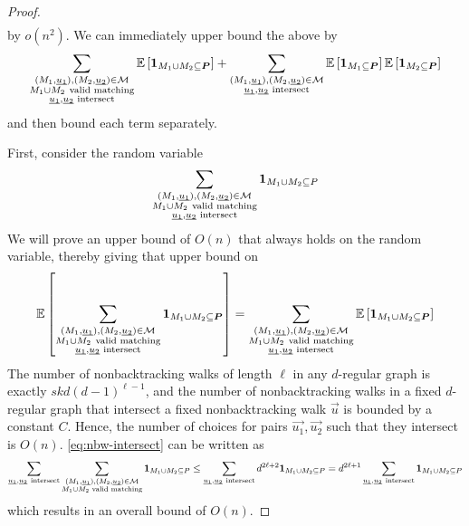 \begin{proof}
\begin{align*}
	\end{align*}
	by $o(n^2)$.  We can immediately upper bound the above by
	\[
		\sum_{\substack{(M_1,\underline{\smash{u_1}}), (M_2,\underline{\smash{u_2}}) \in \mathcal{M}\\ M_1\cup M_2~\text{valid matching}\\ \underline{\smash{u_1}},\underline{\smash{u_2}}\text{ intersect}}} \operatorname*{\mathbb{E}}\left[\boldsymbol{1}_{M_1\cup M_2\subseteq\boldsymbol{P}}\right] + \sum_{\substack{(M_1,\underline{\smash{u_1}}), (M_2,\underline{\smash{u_2}}) \in \mathcal{M}\\ \underline{\smash{u_1}},\underline{\smash{u_2}}\text{ intersect}}} \operatorname*{\mathbb{E}}\left[\boldsymbol{1}_{M_1\subseteq \boldsymbol{P}}\right]\operatorname*{\mathbb{E}}\left[\boldsymbol{1}_{M_2\subseteq\boldsymbol{P}}\right]
	\]
	and then bound each term separately.
	
	First, consider the random variable
	\begin{align} \label{eq:nbw-intersect}
		\sum_{\substack{(M_1,\underline{\smash{u_1}}), (M_2,\underline{\smash{u_2}}) \in \mathcal{M}\\ M_1\cup M_2~\text{valid matching}\\ \underline{\smash{u_1}},\underline{\smash{u_2}}\text{ intersect}}}\boldsymbol{1}_{M_1\cup M_2\subseteq P}
	\end{align}
	We will prove an upper bound of $O(n)$ that always holds on the random variable, thereby giving that upper bound on
	\[
		\operatorname*{\mathbb{E}}\left[\sum_{\substack{(M_1,\underline{\smash{u_1}}), (M_2,\underline{\smash{u_2}}) \in \mathcal{M}\\ M_1\cup M_2~\text{valid matching}\\ \underline{\smash{u_1}},\underline{\smash{u_2}}\text{ intersect}}} \boldsymbol{1}_{M_1\cup M_2\subseteq\boldsymbol{P}}\right] = \sum_{\substack{(M_1,\underline{\smash{u_1}}), (M_2,\underline{\smash{u_2}}) \in \mathcal{M}\\ M_1\cup M_2~\text{valid matching}\\ \underline{\smash{u_1}},\underline{\smash{u_2}}\text{ intersect}}} \operatorname*{\mathbb{E}}\left[\boldsymbol{1}_{M_1\cup M_2\subseteq\boldsymbol{P}}\right]
	\]
	The number of nonbacktracking walks of length $\ell$ in any $d$-regular graph is exactly $skd(d-1)^{\ell-1}$, and the number of nonbacktracking walks in a fixed $d$-regular graph that intersect a fixed nonbacktracking walk $\vec{u}$ is bounded by a constant $C$.  Hence, the number of choices for pairs $\vec{u_1},\vec{u_2}$ such that they intersect is $O\left(n\right)$.  \eqref{eq:nbw-intersect} can be written as
	\[
		\sum_{\underline{\smash{u_1}},\underline{\smash{u_2}}~\text{intersect}} \sum_{\substack{(M_1,\underline{\smash{u_1}}),(M_2,\underline{\smash{u_2}})\in\cal M\\ M_1\cup M_2\text{ valid matching}}} \boldsymbol{1}_{M_1\cup M_2\subseteq P} \le \sum_{\underline{\smash{u_1}},\underline{\smash{u_2}}~\text{intersect}} d^{2\ell+2}\boldsymbol{1}_{M_1\cup M_2\subseteq P}=d^{2\ell+1}\sum_{\underline{\smash{u_1}},\underline{\smash{u_2}}~\text{intersect}} \boldsymbol{1}_{M_1\cup M_2\subseteq P}
	\]
	which results in an overall bound of $O(n)$.


\end{proof}
